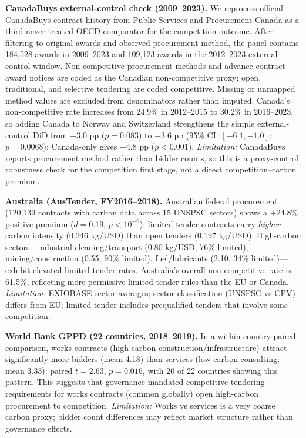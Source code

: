 \documentclass[11pt]{article}
\begin{document}
\textbf{CanadaBuys external-control check (2009--2023).} We reprocess official CanadaBuys contract history from Public Services and Procurement Canada as a third never-treated OECD comparator for the competition outcome. After filtering to original awards and observed procurement method, the panel contains 184,528 awards in 2009--2023 and 109,123 awards in the 2012--2023 external-control window. Non-competitive procurement methods and advance contract award notices are coded as the Canadian non-competitive proxy; open, traditional, and selective tendering are coded competitive. Missing or unmapped method values are excluded from denominators rather than imputed. Canada's non-competitive rate increases from 24.9\% in 2012--2015 to 30.2\% in 2016--2023, so adding Canada to Norway and Switzerland strengthens the simple external-control DiD from $-3.0$ pp ($p = 0.083$) to $-3.6$ pp (95\% CI: $[-6.1,-1.0]$; $p = 0.0068$); Canada-only gives $-4.8$ pp ($p < 0.001$). \textit{Limitation:} CanadaBuys reports procurement method rather than bidder counts, so this is a proxy-control robustness check for the competition first stage, not a direct competition--carbon premium.

\textbf{Australia (AusTender, FY2016--2018).} Australian federal procurement (120,139 contracts with carbon data across 15 UNSPSC sectors) shows a $+24.8\%$ positive premium ($d = 0.19$, $p < 10^{-6}$): limited-tender contracts carry \textit{higher} carbon intensity (0.246 kg/USD) than open tenders (0.197 kg/USD). High-carbon sectors---industrial cleaning/transport (0.80 kg/USD, 76\% limited), mining/construction (0.55, 90\% limited), fuel/lubricants (2.10, 34\% limited)---exhibit elevated limited-tender rates. Australia's overall non-competitive rate is 61.5\%, reflecting more permissive limited-tender rules than the EU or Canada. \textit{Limitation:} EXIOBASE sector averages; sector classification (UNSPSC vs CPV) differs from EU; limited-tender includes prequalified tenders that involve some competition.

\textbf{World Bank GPPD (22 countries, 2018--2019).} In a within-country paired comparison, works contracts (high-carbon construction/infrastructure) attract significantly more bidders (mean 4.18) than services (low-carbon consulting; mean 3.33): paired $t = 2.63$, $p = 0.016$, with 20 of 22 countries showing this pattern. This suggests that governance-mandated competitive tendering requirements for works contracts (common globally) open high-carbon procurement to competition. \textit{Limitation:} Works vs services is a very coarse carbon proxy; bidder count differences may reflect market structure rather than governance effects.
\end{document}
